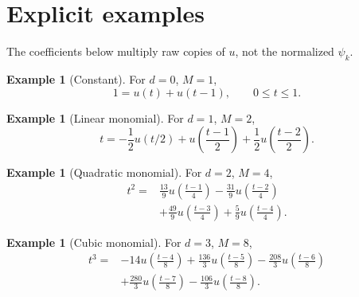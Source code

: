 \documentclass[11pt,oneside]{article}
\theoremstyle{definition}
\newtheorem{example}[theorem]{Example}
\theoremstyle{remark}
\begin{document}
\section{Explicit examples}
\label{sec:examples}

The coefficients below multiply raw copies of $u$, not the normalized $\psi_k$.

\begin{example}[Constant]
For $d=0$, $M=1$,
\begin{equation}
 1=u(t)+u(t-1),\qquad0\le t\le1.                          \label{eq:ex-d0}
\end{equation}
\end{example}

\begin{example}[Linear monomial]
For $d=1$, $M=2$,
\begin{equation}
 t=-\frac12u(t/2)
 +u\!\left(\frac{t-1}{2}\right)
 +\frac12u\!\left(\frac{t-2}{2}\right).                 \label{eq:ex-d1}
\end{equation}
\end{example}

\begin{example}[Quadratic monomial]
For $d=2$, $M=4$,
\begin{equation}
 \begin{aligned}
 t^2={}&\frac{13}{9}u\!\left(\frac{t-1}{4}\right)
 -\frac{31}{9}u\!\left(\frac{t-2}{4}\right)\\
 &+\frac{49}{9}u\!\left(\frac{t-3}{4}\right)
 +\frac{5}{9}u\!\left(\frac{t-4}{4}\right).
 \end{aligned}                                            \label{eq:ex-d2}
\end{equation}
\end{example}

\begin{example}[Cubic monomial]
For $d=3$, $M=8$,
\begin{equation}
 \begin{aligned}
 t^3={}&-14u\!\left(\frac{t-4}{8}\right)
 +\frac{136}{3}u\!\left(\frac{t-5}{8}\right)
 -\frac{208}{3}u\!\left(\frac{t-6}{8}\right)\\
 &+\frac{280}{3}u\!\left(\frac{t-7}{8}\right)
 -\frac{106}{3}u\!\left(\frac{t-8}{8}\right).
 \end{aligned}                                            \label{eq:ex-d3}
\end{equation}
\end{example}
\end{document}
